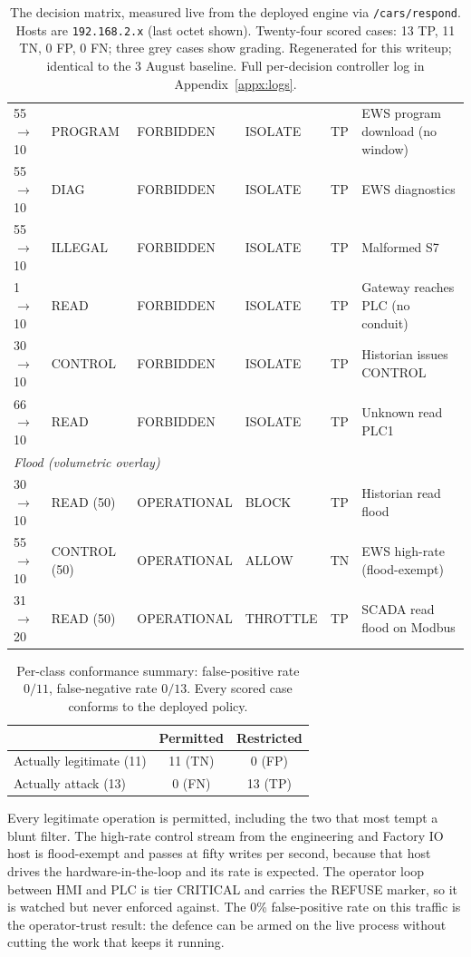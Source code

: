 \begin{table}[t]
\begin{tabular}{llllcl}
55$\to$10 & PROGRAM & FORBIDDEN & ISOLATE & TP & EWS program download (no window) \\
55$\to$10 & DIAG & FORBIDDEN & ISOLATE & TP & EWS diagnostics \\
55$\to$10 & ILLEGAL & FORBIDDEN & ISOLATE & TP & Malformed S7 \\
1$\to$10 & READ & FORBIDDEN & ISOLATE & TP & Gateway reaches PLC (no conduit) \\
30$\to$10 & CONTROL & FORBIDDEN & ISOLATE & TP & Historian issues CONTROL \\
66$\to$10 & READ & FORBIDDEN & ISOLATE & TP & Unknown read PLC1 \\
\multicolumn{6}{l}{\textit{Flood (volumetric overlay)}} \\
30$\to$10 & READ (50) & OPERATIONAL & BLOCK & TP & Historian read flood \\
55$\to$10 & CONTROL (50) & OPERATIONAL & ALLOW & TN & EWS high-rate (flood-exempt) \\
31$\to$20 & READ (50) & OPERATIONAL & THROTTLE & TP & SCADA read flood on Modbus \\
\hline
\end{tabular}
\caption[The decision matrix]{The decision matrix, measured live from the deployed engine via \texttt{/cars/respond}. Hosts are \texttt{192.168.2.x} (last octet shown). Twenty-four scored cases: 13 TP, 11 TN, 0 FP, 0 FN; three grey cases show grading. Regenerated for this writeup; identical to the 3 August baseline. Full per-decision controller log in Appendix~\ref{appx:logs}.}
\label{tab:conformance}
\end{table}

\begin{table}[t]
\centering
\begin{tabular}{lcc}
\hline
 & Permitted & Restricted \\
\hline
Actually legitimate (11) & 11 (TN) & 0 (FP) \\
Actually attack (13) & 0 (FN) & 13 (TP) \\
\hline
\end{tabular}
\caption[Per-class conformance summary]{Per-class conformance summary: false-positive rate $0/11$, false-negative rate $0/13$. Every scored case conforms to the deployed policy.}
\label{tab:confusion}
\end{table}

Every legitimate operation is permitted, including the two that most tempt a blunt filter. The high-rate control stream from the engineering and Factory IO host is flood-exempt and passes at fifty writes per second, because that host drives the hardware-in-the-loop and its rate is expected. The operator loop between HMI and PLC is tier CRITICAL and carries the REFUSE marker, so it is watched but never enforced against. The 0\% false-positive rate on this traffic is the operator-trust result: the defence can be armed on the live process without cutting the work that keeps it running.

